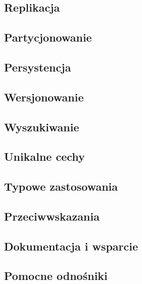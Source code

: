 \subsection*{Replikacja}

\subsection*{Partycjonowanie}

\subsection*{Persystencja}

\subsection*{Wersjonowanie}

\subsection*{Wyszukiwanie}

\subsection*{Unikalne cechy}

\subsection*{Typowe zastosowania}

\subsection*{Przeciwwskazania}

\subsection*{Dokumentacja i wsparcie}

\subsection*{Pomocne odnośniki}